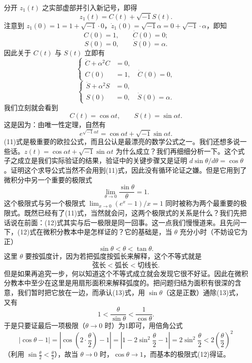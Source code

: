 分开 $z_1(t)$ 之实部虚部并引入新记号，即得
\[
z_1(t)=C(t)+\sqrt{-1}S(t).
\]
注意到 $z_1(0)=1=1+\sqrt{-1}\cdot0$，$\dot z_1(0)=\sqrt{-1}\alpha=0+\sqrt{-1}\cdot\alpha$，即知
\[
C(0)=1,\qquad \dot C(0)=0;
\]
\[
S(0)=0,\qquad \dot S(0)=\alpha.
\]
因此关于 $C(t)$ 与 $S(t)$ 立即有
\[
\left\{\begin{aligned}
\ddot C+\alpha^2C&=0,\\
C(0)&=1,\quad \dot C(0)=0,
\end{aligned}\right. \tag{10$_1$}
\]
\[
\left\{\begin{aligned}
\ddot S+\alpha^2S&=0,\\
S(0)&=0,\quad \dot S(0)=\alpha.
\end{aligned}\right. \tag{10$_2$}
\]
我们立刻就会看到
\[
C(t)=\cos\alpha t,\qquad S(t)=\sin\alpha t.
\]
这是因为：由唯一性定理，自然有
\[
e^{\sqrt{-1}\alpha t}=\cos\alpha t+\sqrt{-1}\sin\alpha t. \tag{11}
\]
(11)式是极重要的欧拉公式，而且公认是最漂亮的数学公式之一。我们还想多说一些话。$z(t)=\cos\alpha t+\sqrt{-1}\sin\alpha t$ 为什么成立？我们再细细分析一下。这个式子之成立是我们实际验证的结果，验证中的关键步骤又是证明 $d\sin\theta/d\theta=\cos\theta$。证明这个求导公式当然不会用到(11)式，因此没有循环论证之嫌。但是它用到了微积分中另一个重要的极限式
\[
\lim_{\theta\to0}\frac{\sin\theta}{\theta}=1. \tag{12}
\]
这个极限式与另一个极限式 $\lim_{x\to0}(e^x-1)/x=1$ 同时被称为两个最重要的极限式。既然已经有了(11)式，当然就会问，这两个极限式的关系是什么？我们先把话说在前面：(12)式其实与后一极限是同一回事。这一点我们慢慢道来。且先问一下，(12)式在微积分教本中是怎样证的？它的基础是，当 $\theta$ 充分小时（不妨设它为正）
\[
\sin\theta<\theta<\tan\theta. \tag{13}
\]
这里 $\theta$ 要按弧度计，因为若把弧度按弧长来解释，这个不等式就是
\[
\text{弦长}<\text{弧长}<\text{切线长}.
\]
但是如果再追究一步，何以知道这个不等式成立就会发现它很不好证。因此在微积分教本中至少在这里是用扇形面积来解释弧度的。把问题归结为面积有很深的含意，我们暂时把它放在一边，而承认(13)式，用 $\sin\theta$（这是正数）通除(13)式，又有
\[
1<\frac{\theta}{\sin\theta}<\frac1{\cos\theta}.
\]
于是只要证最后一项极限（$\theta\to0$ 时）为1即可，用倍角公式
\[
|\cos\theta-1|=\left|\cos\left(2\cdot\frac\theta2\right)-1\right|
=\left|1-2\sin^2\frac\theta2-1\right|
=2\sin^2\frac\theta2<2\left(\frac\theta2\right)^2
\]
（利用 $\sin\frac\theta2<\frac\theta2$），故当 $\theta\to0$ 时，$\cos\theta\to1$，而基本的极限式(12)得证。

